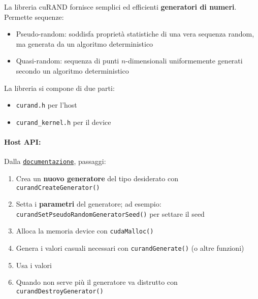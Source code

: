 La libreria cuRAND fornisce semplici ed efficienti \textbf{generatori di numeri}. Permette sequenze: 
\begin{itemize}
	\item Pseudo-random: soddisfa proprietà statistiche di una vera sequenza random, ma generata da un algoritmo deterministico
	\item Quasi-random: sequenza di punti $n$-dimensionali uniformemente generati secondo un algoritmo deterministico
\end{itemize}

La libreria si compone di due parti:
\begin{itemize}
	\item \texttt{curand.h} per l'host
	\item \texttt{curand\_kernel.h} per il device
\end{itemize}

\paragraph{Host API:} Dalla \href{https://docs.nvidia.com/cuda/curand/index.html}{\texttt{documentazione}}, passaggi:
\begin{enumerate}
	\item Crea un \textbf{nuovo generatore} del tipo desiderato con \texttt{curandCreateGenerator()}
	\item Setta i \textbf{parametri} del generatore; ad esempio: \texttt{curandSetPseudoRandomGeneratorSeed()} per settare il seed
	\item Alloca la memoria device con \texttt{cudaMalloc()}
	\item Genera i valori casuali necessari con \texttt{curandGenerate()} (o altre funzioni)
	\item Usa i valori
	\item Quando non serve più il generatore va distrutto con \texttt{curandDestroyGenerator()}
\end{enumerate}

